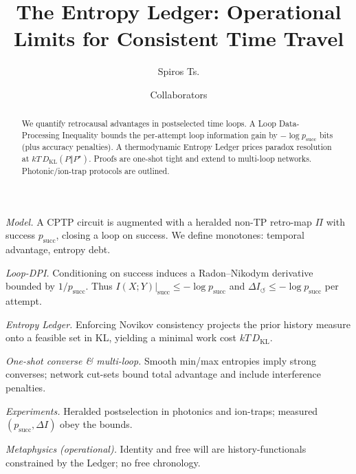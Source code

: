 \documentclass[aps,prl,twocolumn,10pt,superscriptaddress,longbibliography]{revtex4-2}
\newcommand{\Ps}{p_{\mathrm{succ}}}
\begin{document}
\title{The Entropy Ledger: Operational Limits for Consistent Time Travel}
\author{Spiros Ts.}
\author{Collaborators}
\begin{abstract}
We quantify retrocausal advantages in postselected time loops. A Loop Data-Processing Inequality bounds the per-attempt loop information gain by $-\log \Ps$ bits (plus accuracy penalties). A thermodynamic Entropy Ledger prices paradox resolution at $kT\,D_{\mathrm{KL}}(P\Vert P^\star)$. Proofs are one-shot tight and extend to multi-loop networks. Photonic/ion-trap protocols are outlined.
\end{abstract}
\maketitle

\emph{Model.} A CPTP circuit is augmented with a heralded non-TP retro-map $\Pi$ with success $\Ps$, closing a loop on success. We define monotones: temporal advantage, entropy debt.

\emph{Loop-DPI.} Conditioning on success induces a Radon--Nikodym derivative bounded by $1/\Ps$. Thus $I(X;Y)|_{\mathrm{succ}}\le -\log \Ps$ and $\Delta I_{\circlearrowleft}\le -\log \Ps$ per attempt.

\emph{Entropy Ledger.} Enforcing Novikov consistency projects the prior history measure onto a feasible set in KL, yielding a minimal work cost $kT\,D_{\mathrm{KL}}$.

\emph{One-shot converse \& multi-loop.} Smooth min/max entropies imply strong converses; network cut-sets bound total advantage and include interference penalties.

\emph{Experiments.} Heralded postselection in photonics and ion-traps; measured $(\Ps,\Delta I)$ obey the bounds.

\emph{Metaphysics (operational).} Identity and free will are history-functionals constrained by the Ledger; no free chronology.



\end{document}
